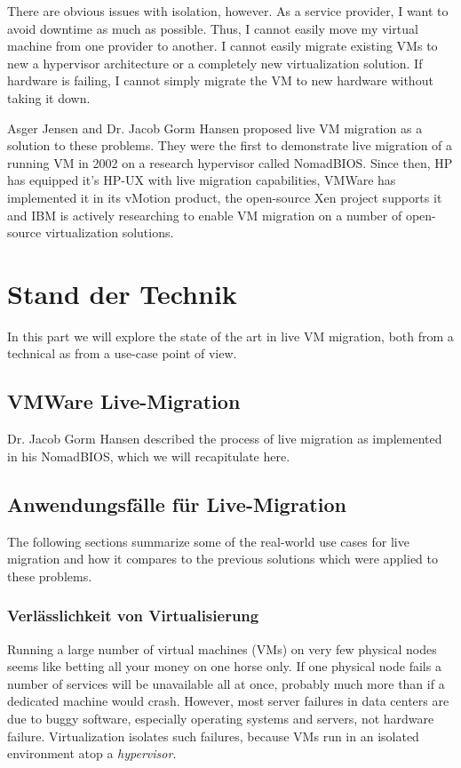 \documentclass[journal]{IEEEtran}
\begin{document}
There are obvious issues with isolation, however. As a service
provider, I want to avoid downtime as much as possible. Thus, I cannot
easily move my virtual machine from one provider to another. I cannot
easily migrate existing VMs to new a hypervisor architecture or a
completely new virtualization solution. If hardware is failing, I
cannot simply migrate the VM to new hardware without taking it down.

Asger Jensen and Dr. Jacob Gorm Hansen proposed live VM migration as a
solution to these problems. They were the first to demonstrate live
migration of a running VM in 2002 on a research hypervisor called
NomadBIOS. Since then, HP has equipped it's HP-UX with live migration
capabilities, VMWare has implemented it in its vMotion product, the
open-source Xen project supports it and IBM is actively researching to
enable VM migration on a number of open-source virtualization
solutions.


\section{Stand der Technik}
\label{sec:sota}

In this part we will explore the state of the art in live VM
migration, both from a technical as from a use-case point of view.

\subsection{VMWare Live-Migration}
\label{sec:livemigration}

Dr. Jacob Gorm Hansen described the process of live migration
as implemented in his NomadBIOS, which we will recapitulate here.

\subsection{Anwendungsfälle für Live-Migration}

The following sections summarize some of the real-world use cases for
live migration and how it compares to the previous solutions which
were applied to these problems.

\subsubsection{Verlässlichkeit von Virtualisierung}

Running a large number of virtual machines (VMs) on very few physical
nodes seems like betting all your money on one horse only. If one
physical node fails a number of services will be unavailable all at
once, probably much more than if a dedicated machine would
crash. However, most server failures in data centers are due to buggy
software, especially operating systems and servers, not hardware
failure. Virtualization isolates such failures, because VMs run in an
isolated environment atop a \emph{hypervisor}.
\end{document}
